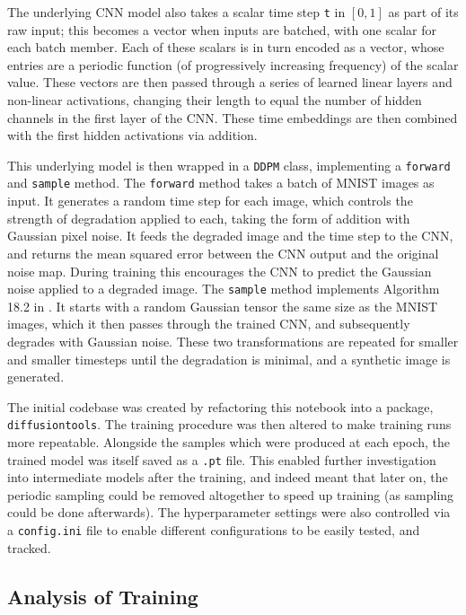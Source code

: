 \documentclass[12pt]{article}
\begin{document}
The underlying CNN model also takes a scalar time step \texttt{t} in $[0,1]$ as part of its raw input; this becomes a vector when inputs are batched,
with one scalar for each batch member.
Each of these scalars is in turn encoded as a vector, whose entries are a periodic function (of progressively increasing frequency)
of the scalar value.
These vectors are then passed through a series of learned linear layers and non-linear activations,
changing their length to equal the number of hidden channels in the first layer of the CNN.
These time embeddings are then combined with the first hidden activations via addition.

This underlying model is then wrapped in a \texttt{DDPM} class, implementing a \texttt{forward} and \texttt{sample} method.
The \texttt{forward} method takes a batch of MNIST images as input.
It generates a random time step for each image, which controls the strength of degradation applied to each,
taking the form of addition with Gaussian pixel noise.
It feeds the degraded image and the time step to the CNN, and returns the mean squared error between the CNN output and the original noise map.
During training this encourages the CNN to predict the Gaussian noise applied to a degraded image.
The \texttt{sample} method implements Algorithm 18.2 in \cite{prince2023understanding}.
It starts with a random Gaussian tensor the same size as the MNIST images, which it then passes through the trained CNN,
and subsequently degrades with Gaussian noise.
These two transformations are repeated for smaller and smaller timesteps until the degradation is minimal, and a synthetic image is generated.

The initial codebase was created by refactoring this notebook into a package, \texttt{diffusiontools}.
The training procedure was then altered to make training runs more repeatable.
Alongside the samples which were produced at each epoch, the trained model was itself saved as a \texttt{.pt} file.
This enabled further investigation into intermediate models after the training, and indeed meant that later on,
the periodic sampling could be removed altogether to speed up training (as sampling could be done afterwards).
The hyperparameter settings were also controlled via a \texttt{config.ini} file to enable different configurations to be easily tested, and tracked.

\subsection{Analysis of Training}
\end{document}
